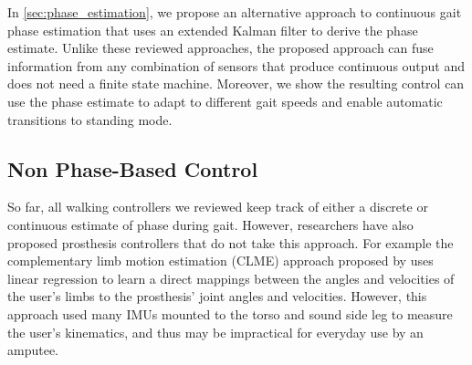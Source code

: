 In \cref{sec:phase_estimation}, we propose an alternative approach to continuous
gait phase estimation that uses an extended Kalman filter to derive the phase
estimate. Unlike these reviewed approaches, the proposed approach can fuse
information from any combination of sensors that produce continuous output and
does not need a finite state machine. Moreover, we show the resulting control
can use the phase estimate to adapt to different gait speeds and enable
automatic transitions to standing mode. 

\subsection{Non Phase-Based Control}

So far, all walking controllers we reviewed keep track of either a discrete or
continuous estimate of phase during gait. However, researchers have also
proposed prosthesis controllers that do not take this approach. For example the
complementary limb motion estimation (CLME) approach proposed by
\citet{vallery2011complementary} uses linear regression to learn a direct
mappings between the angles and velocities of the user's limbs to the
prosthesis' joint angles and velocities. However, this approach used many IMUs
mounted to the torso and sound side leg to measure the user's kinematics, and
thus may be impractical for everyday use by an amputee.

